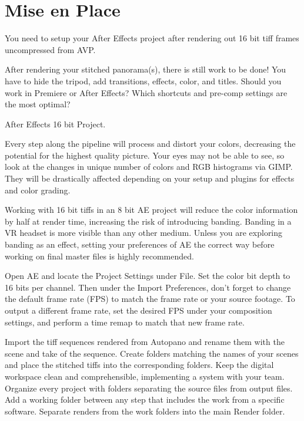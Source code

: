 \chapter{Mise en Place}
\pagecolor{white}
\label{chap:47}
\begin{fullwidth}

\problem

{\large You need to setup your After Effects project after rendering out 16 bit tiff frames uncompressed from AVP. \par}

After rendering your stitched panorama(s), there is still work to be done! You have to hide the tripod, add transitions, effects, color, and titles. Should you work in Premiere or After Effects? Which shortcuts and pre-comp settings are the most optimal?

\solutions

{\large After Effects 16 bit Project. \par}

Every step along the pipeline will process and distort your colors, decreasing the potential for the highest quality picture. Your eyes may not be able to see, so look at the changes in unique number of colors and RGB histograms via GIMP. They will be drastically affected depending on your setup and plugins for effects and color grading.


Working with 16 bit tiffs in an 8 bit AE project will reduce the color information by half at render time, increasing the risk of introducing banding. Banding in a VR headset is more visible than any other medium. Unless you are exploring banding as an effect, setting your preferences of AE the correct way before working on final master files is highly recommended. 

Open AE and locate the Project Settings under File. Set the color bit depth to 16 bits per channel. Then under the Import Preferences, don't forget to change the default frame rate (FPS) to match the frame rate or your source footage. To output a different frame rate, set the desired FPS under your composition settings, and perform a time remap to match that new frame rate.


Import the tiff sequences rendered from Autopano and rename them with the scene and take of the sequence. Create folders matching the names of your scenes and place the stitched tiffs into the corresponding folders. Keep the digital workspace clean and comprehensible, implementing a system with your team. Organize every project with folders separating the source files from output files. Add a working folder between any step that includes the work from a specific software. Separate renders from the work folders into the main Render folder. 


\end{fullwidth}

